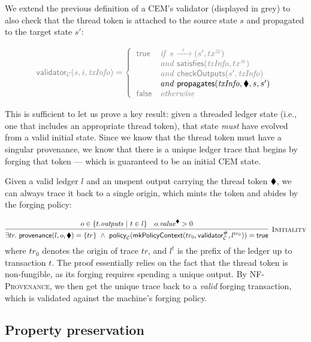 We extend the previous definition of a CEM's validator (displayed in
grey) to also check that the thread token is attached to the source
state $s$ and propagated to the target state $s'$:

\begin{displaymath}
\color{gray}
\valC(s, i, \mi{txInfo}) = \left\{
  \begin{array}{ll}
  \true  & \mi{if}  \ \CStep{s} \\
         & \mi{and} \ \satisfies(\mi{txInfo}, \txeq) \\
         & \mi{and} \ \checkOutputs(s', \mi{txInfo}) \\
         & \begingroup\color{black}
           \mi{and} \ \s{propagates}(\mi{txInfo}, \nft, s, s')
           \endgroup \\
  \false & \mi{otherwise}
  \end{array}
\right.
\end{displaymath}

This is sufficient to let us prove a key result: given a threaded ledger
state (i.e., one that includes an appropriate thread token), that state
\emph{must} have evolved from a valid initial state.  Since we know
that the thread token must have a singular provenance, we know that
there is a unique ledger trace that begins by forging that token
--- which is guaranteed to be an initial CEM state.

\begin{proposition}[Initiality]
Given a valid ledger $l$ and an unspent output carrying the thread
token $\blacklozenge$, we can always trace it back to a single origin, which
mints the token and abides by the forging policy:
\end{proposition}
%
\begin{displaymath}
\infer[\textsc{Initiality}]
  { \exists tr. \ \s{provenance}(l, o, \nft) = \{ tr \}
  \ \land \
    \polC(\mkMpsContext(tr_0, \hash{\valC}, l^{tr_0})) = \true
  }
  {%
    o \in \{ t.\outputs \ | \ t \in l \}
  & o.\val^\nft > 0
  }
\end{displaymath}
%
where $tr_0$ denotes the origin of trace $tr$,
and $l^t$ is the prefix of the ledger up to transaction $t$.
The proof essentially relies on the fact that the thread token is
non-fungible, as its forging requires spending a unique output.
By \textsc{NF-Provenance}, we then get the unique trace back to a
\textit{valid} forging transaction, which is validated against the
machine's forging policy.

\subsection{Property preservation}

